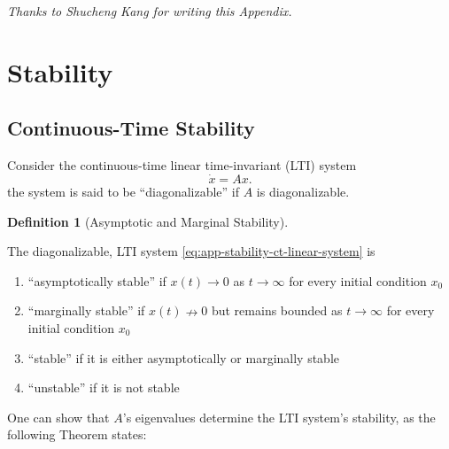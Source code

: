 \documentclass[
]{book}
\theoremstyle{definition}
\newtheorem{definition}{Definition}[chapter]
\theoremstyle{definition}
\theoremstyle{definition}
\theoremstyle{definition}
\theoremstyle{remark}
\begin{document}
\emph{Thanks to Shucheng Kang for writing this Appendix.}

\section{Stability}\label{app-lti-stability}

\subsection{Continuous-Time Stability}\label{app-lti-stability-ct}

Consider the continuous-time linear time-invariant (LTI) system
\begin{equation}
\dot{x} = A x.
\label{eq:app-stability-ct-linear-system}
\end{equation}
the system is said to be ``diagonalizable'' if \(A\) is diagonalizable.

\begin{definition}[Asymptotic and Marginal Stability]
\protect\hypertarget{def:ltistable}{}\label{def:ltistable}

The diagonalizable, LTI system \eqref{eq:app-stability-ct-linear-system} is

\begin{enumerate}
\def\labelenumi{\arabic{enumi}.}
\item
  ``asymptotically stable'' if \(x(t) \rightarrow 0\) as \(t \rightarrow \infty\) for every initial condition \(x_0\)
\item
  ``marginally stable'' if \(x(t) \nrightarrow 0\) but remains bounded as \(t \rightarrow \infty\) for every initial condition \(x_0\)
\item
  ``stable'' if it is either asymptotically or marginally stable
\item
  ``unstable'' if it is not stable
\end{enumerate}

\end{definition}

One can show that \(A\)'s eigenvalues determine the LTI system's stability, as the following Theorem states:
\end{document}
